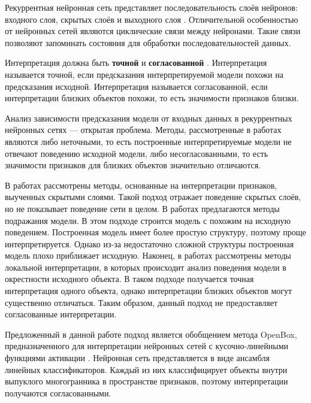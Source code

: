 \documentclass[a4paper, 12pt]{article}
\begin{document}
Рекуррентная нейронная сеть представляет последовательность слоёв нейронов: входного слоя, скрытых слоёв и выходного слоя \cite{sherstinsky2020fundrnn}. Отличительной особенностью от нейронных сетей являются циклические связи между нейронами. Такие связи позволяют запоминать состояния для обработки последовательностей данных.

Интерпретация должна быть \textbf{точной} и \textbf{согласованной} \cite{chu2019exact}. Интерпретация называется точной, если предсказания интерпретируемой модели похожи на предсказания исходной. Интерпретация называется согласованной, если интерпретации близких объектов похожи, то есть значимости признаков близки.

Анализ зависимости предсказания модели от входных данных в рекуррентных нейронных сетях --- открытая проблема. Методы, рассмотренные в работах \cite{dosovitskiy2016inverting, zhou2018interpreting, NIPS2014_ea8fcd92, bastani2019interpreting, zhou2015learning, simonyan2014deep} являются либо неточными, то есть построенные интерпретируемые модели не отвечают поведению исходной модели, либо несогласованными, то есть значимости признаков для близких объектов значительно отличаются.

В работах \cite{dosovitskiy2016inverting, zhou2018interpreting} рассмотрены методы, основанные на интерпретации признаков, выученных скрытыми слоями. Такой подход отражает поведение скрытых слоёв, но не показывает поведение сети в целом. В работах \cite{NIPS2014_ea8fcd92, bastani2019interpreting} предлагаются методы подражания модели. В этом подходе строится модель с похожим на исходную поведением. Построенная модель имеет более простую структуру, поэтому проще интерпретируется. Однако из-за недостаточно сложной структуры построенная модель плохо приближает исходную. Наконец, в работах \cite{zhou2015learning, simonyan2014deep} рассмотрены методы локальной интерпретации, в которых происходит анализ поведения модели в окрестности исходного объекта. В таком подходе получается точная интерпретация одного объекта, однако интерпретации близких объектов могут существенно отличаться. Таким образом, данный подход не предоставляет согласованные интерпретации.

Предложенный в данной работе подход является обобщением метода OpenBox, предназначенного для интерпретации нейронных сетей с кусочно-линейными  функциями активации \cite{chu2019exact}. Нейронная сеть представляется в виде ансамбля линейных классификаторов. Каждый из них классифицирует объекты внутри выпуклого многогранника в пространстве признаков, поэтому интерпретации получаются согласованными.
\end{document}
